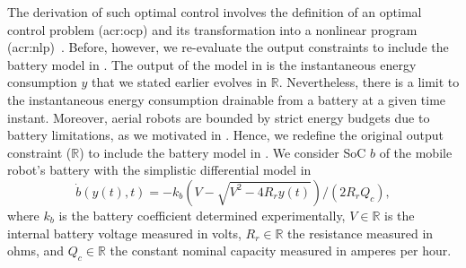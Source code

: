 The derivation of such optimal control involves the definition of an optimal control problem (\Gls{acr:ocp}) and its transformation into a nonlinear program (\Gls{acr:nlp})~\citep{rawlings2017model,grune2017nonlinear}. Before, however, we re-evaluate the output constraints to include the battery model in . 
The output of the model in  is the instantaneous energy consumption $y$ that we stated earlier evolves in $\mathbb{R}$. Nevertheless, there is a limit to the instantaneous energy consumption drainable from a battery at a given time instant. Moreover, aerial robots are bounded by strict energy budgets due to battery limitations, as we motivated in . Hence, we redefine the original output constraint ($\mathbb{R}$) to include the battery model in . We consider SoC $b$ of the mobile robot's battery with the simplistic differential model in 
\begin{equation}\label{eq:bat}
  \dot{b}(y(t),t)=-k_b\left(V-
  \sqrt{
    V^2-
    4R_ry(t)}
  \right)/(2R_rQ_c),
\end{equation}
where $k_b$ is the battery coefficient determined experimentally,  $V\in\mathbb{R}$ is the internal battery voltage measured in volts, $R_r\in\mathbb{R}$ the resistance measured in ohms, and $Q_c\in\mathbb{R}$ the constant nominal capacity measured in amperes per hour. 

